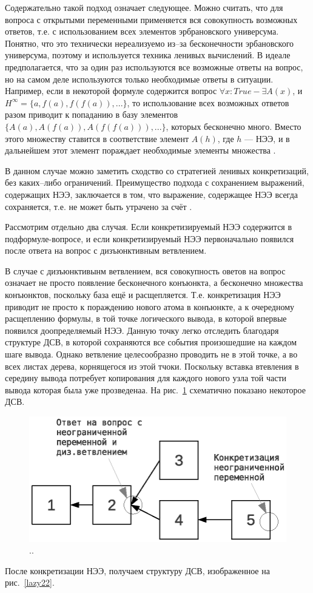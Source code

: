 Содержательно такой подход означает следующее. Можно считать, что для вопроса с открытыми переменными применяется вся совокупность возможных ответов, т.е. с использованием всех элементов эрбрановского универсума. Понятно, что это технически нереализуемо из--за бесконечности эрбановского универсума, поэтому и используется техника ленивых вычислений. В идеале предполагается, что за один раз используются все возможные ответы на вопрос, но на самом деле используются только необходимые ответы в  ситуации. Например, если в некоторой формуле содержится вопрос $\forall x: True  - \exists A(x)$, и $H^{\infty}= \{a, f(a), f(f(a)), ...\}$, то использование всех возможных ответов разом приводит к попаданию в базу элементов $\{A(a), A(f(a)), A(f(f(a))), ...\}$, которых бесконечно много. Вместо этого множеству ставится в соответствие элемент $A(h)$, где $h$ --- НЭЭ, и в дальнейшем этот элемент пораждает необходимые элементы множества .

В данном случае можно заметить сходство со стратегией ленивых конкретизаций, без каких--либо ограничений. Преимущество подхода с сохранением выражений, содержащих НЭЭ, заключается в том, что выражение, содержащее НЭЭ всегда сохраняется, т.е. не может быть утрачено за счёт .

Рассмотрим отдельно два случая. Если конкретизируемый НЭЭ содержится в подформуле-вопросе, и если конкретизируемый НЭЭ первоначально появился после ответа на вопрос с дизъюнктивным ветвлением.

В случае с дизъюнктивынм ветвлением, вся совокупность оветов на вопрос означает не просто появление бесконечного конъюнкта, а бесконечно множества конъюнктов, поскольку база ещё и расщепляется. Т.е. конкретизация НЭЭ приводит не просто к пораждению нового атома в конъюнкте, а к очередному расщеплению формулы, в той точке логического вывода, в которой впервые появился доопределяемый НЭЭ. Данную точку легко отследить благодаря структуре ДСВ, в которой сохраняются все события произошедшие на каждом шаге вывода. Однако ветвление целесообразно проводить не в этой точке, а во всех листах дерева, корнящегося из этой тчоки. Поскольку вставка втевления в середину вывода потребует копирования для каждого нового узла той части вывода которая была уже прозведенаа.  На рис.~\ref{lazy21} схематично показано некоторое ДСВ.
\begin{figure}[h]
	\centering
	\includegraphics[width=0.5\linewidth]{pics/Lazy21.eps}
	\caption{..}
	\label{lazy21}
\end{figure}
После конкретизации НЭЭ, получаем структуру ДСВ, изображенное на рис.~\ref{lazy22}.

